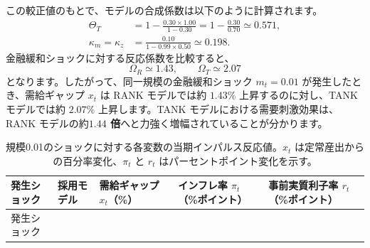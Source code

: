 \documentclass[
  japanese,
  lualatex,
  ja=standard,
  12pt,
  a4paper]{ltjsarticle}
\begin{document}
この較正値のもとで、モデルの合成係数は以下のように計算されます。 \[
\begin{aligned}
\Theta_T
&=
1 - \frac{0.30 \times 1.00}{1 - 0.30}
=
1 - \frac{0.30}{0.70}
\simeq
0.571,
\\
\kappa_m = \kappa_z
&= \frac{0.10}{1 - 0.99 \times 0.50} \simeq 0.198.
\end{aligned}
\] 金融緩和ショックに対する反応係数を比較すると、 \[
\Omega_R \simeq 1.43,
\qquad
\Omega_T \simeq 2.07
\] となります。したがって、同一規模の金融緩和ショック \(m_t = 0.01\)
が発生したとき、需給ギャップ \(x_t\) は RANK モデルでは約 \(1.43\%\)
上昇するのに対し、TANK モデルでは約 \(2.07\%\) 上昇します。TANK
モデルにおける需要刺激効果は、RANK モデルの約\textbf{\(1.44\)
倍}へと力強く増幅されていることが分かります。

\begin{longtable}[]{@{}
  >{\raggedright\arraybackslash}p{}
  >{\raggedright\arraybackslash}p{}
  >{\raggedleft\arraybackslash}p{}
  >{\raggedleft\arraybackslash}p{}
  >{\raggedleft\arraybackslash}p{}@{}}
\caption{規模0.01のショックに対する各変数の当期インパルス反応値。\(x_t\)
は定常産出からの百分率変化、\(\pi_t\) と \(r_t\)
はパーセントポイント変化を示す。}\tabularnewline
\toprule\noalign{}
\begin{minipage}[b]{\linewidth}\raggedright
発生ショック
\end{minipage} & \begin{minipage}[b]{\linewidth}\raggedright
採用モデル
\end{minipage} & \begin{minipage}[b]{\linewidth}\raggedleft
需給ギャップ \(x_t\)（\%）
\end{minipage} & \begin{minipage}[b]{\linewidth}\raggedleft
インフレ率 \(\pi_t\)（\%ポイント）
\end{minipage} & \begin{minipage}[b]{\linewidth}\raggedleft
事前実質利子率 \(r_t\)（\%ポイント）
\end{minipage} \\
\midrule\noalign{}
\endfirsthead
\toprule\noalign{}
\begin{minipage}[b]{\linewidth}\raggedright
発生ショック
\end{minipage} & \begin{minipage}[b]{\linewidth}\raggedright

\end{minipage}
\end{longtable}
\end{document}
